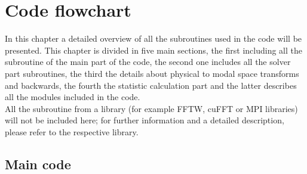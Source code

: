 \chapter{Code flowchart}
\label{chap: flowchart}
In this chapter a detailed overview of all the subroutines used in the code will be presented. 
This chapter is divided in five main sections, the first including all the subroutine of the main part of the code, the second one includes all the solver part subroutines, the third the details about physical to modal space transforms and backwards,  the fourth the statistic calculation part and the latter describes all the modules included in the code.\\
All the subroutine from a library (for example FFTW, cuFFT or MPI libraries) will not be included here; for further information and a detailed description, please refer to the respective library.

\section{Main code}


